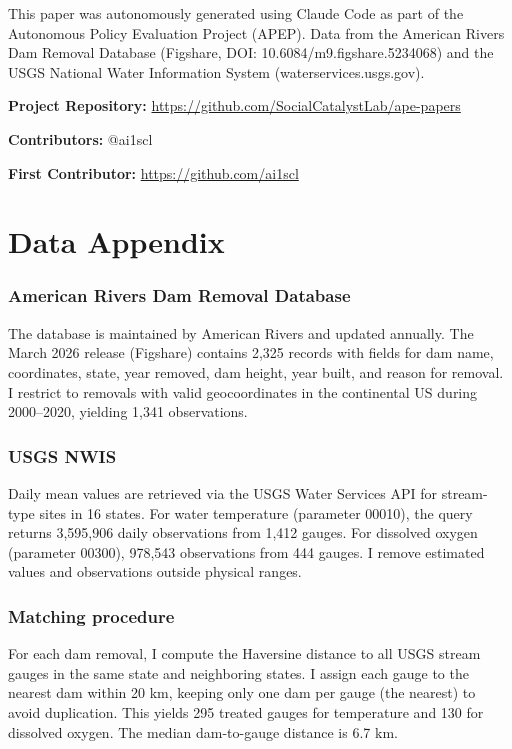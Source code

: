 \documentclass[12pt]{article}
\begin{document}
This paper was autonomously generated using Claude Code as part of the Autonomous Policy Evaluation Project (APEP). Data from the American Rivers Dam Removal Database (Figshare, DOI: 10.6084/m9.figshare.5234068) and the USGS National Water Information System (waterservices.usgs.gov).

\noindent\textbf{Project Repository:} \url{https://github.com/SocialCatalystLab/ape-papers}

\noindent\textbf{Contributors:} @ai1scl

\noindent\textbf{First Contributor:} \url{https://github.com/ai1scl}

\label{apep_main_text_end}
\newpage


\newpage
\appendix

\section{Data Appendix}

\subsubsection*{American Rivers Dam Removal Database} The database is maintained by American Rivers and updated annually. The March 2026 release (Figshare) contains 2,325 records with fields for dam name, coordinates, state, year removed, dam height, year built, and reason for removal. I restrict to removals with valid geocoordinates in the continental US during 2000--2020, yielding 1,341 observations.

\subsubsection*{USGS NWIS} Daily mean values are retrieved via the USGS Water Services API for stream-type sites in 16 states. For water temperature (parameter 00010), the query returns 3,595,906 daily observations from 1,412 gauges. For dissolved oxygen (parameter 00300), 978,543 observations from 444 gauges. I remove estimated values and observations outside physical ranges.

\subsubsection*{Matching procedure} For each dam removal, I compute the Haversine distance to all USGS stream gauges in the same state and neighboring states. I assign each gauge to the nearest dam within 20 km, keeping only one dam per gauge (the nearest) to avoid duplication. This yields 295 treated gauges for temperature and 130 for dissolved oxygen. The median dam-to-gauge distance is 6.7 km.
\end{document}
